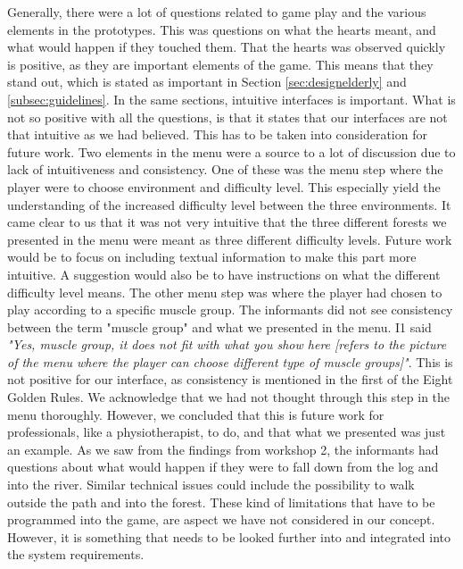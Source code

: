 Generally, there were a lot of questions related to game play and the various elements in the prototypes. This was questions on what the hearts meant, and what would happen if they touched them. That the hearts was observed quickly is positive, as they are important elements of the game. This means that they stand out, which is stated as important in Section \ref{sec:designelderly} and \ref{subsec:guidelines}. In the same sections, intuitive interfaces is important. What is not so positive with all the questions, is that it states that our interfaces are not that intuitive as we had believed. This has to be taken into consideration for future work. Two elements in the menu were a source to a lot of discussion due to lack of intuitiveness and consistency. One of these was the menu step where the player were to choose environment and difficulty level. This especially yield the understanding of the increased difficulty level between the three environments. It came clear to us that it was not very intuitive that the three different forests we presented in the menu were meant as three different difficulty levels. Future work would be to focus on including textual information to make this part more intuitive. A suggestion would also be to have instructions on what the different difficulty level means. The other menu step was where the player had chosen to play according to a specific muscle group. The informants did not see consistency between the term "muscle group" and what we presented in the menu. I1 said \emph{"Yes, muscle group, it does not fit with what you show here [refers to the picture of the menu where the player can choose different type of muscle groups]"}. This is not positive for our interface, as consistency is mentioned in the first of the Eight Golden Rules. We acknowledge that we had not thought through this step in the menu thoroughly. However, we concluded that this is future work for professionals, like a physiotherapist, to do, and that what we presented was just an example. As we saw from the findings from workshop 2, the informants had questions about what would happen if they were to fall down from the log and into the river. Similar technical issues could include the possibility to walk outside the path and into the forest. These kind of limitations that have to be programmed into the game, are aspect we have not considered in our concept. However, it is something that needs to be looked further into and integrated into the system requirements.   

